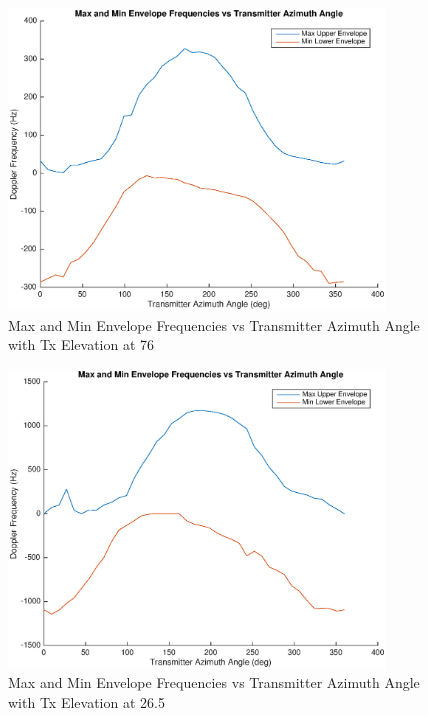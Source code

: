 \begin{figure}
	\begin{center}
		\includegraphics[width=10cm]{images/simulation/Azimuth_angle_50_max_doppler.eps}
		\caption{Max and Min Envelope Frequencies vs Transmitter Azimuth Angle with Tx Elevation at 76\textdegree}
		\label{fig:tx_azimuth_angle_50}
	\end{center}
\end{figure}

\begin{figure}
	\begin{center}
		\includegraphics[width=10cm]{images/simulation/Azimuth_angle_400_max_doppler.eps}
		\caption{Max and Min Envelope Frequencies vs Transmitter Azimuth Angle with Tx Elevation at 26.5\textdegree}
		\label{fig:tx_azimuth_angle_400}
	\end{center}
\end{figure}

